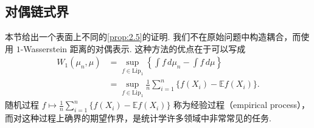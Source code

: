 \subsection{对偶链式界}\label{sec:2.3}
本节给出一个表面上不同的\autoref{prop:2.5}的证明. 我们不在原始问题中构造耦合，而使用 $1$-Wasserstein 距离的对偶表示. 这种方法的优点在于可以写成
\begin{equation}\label{eq:2.6}
\begin{aligned}
W_1(\mu_n,\mu)&=\sup_{f\in\mathrm{Lip}_1}\left\{\int f\,d\mu_n-\int f\,d\mu\right\}\\
&=\sup_{f\in\mathrm{Lip}_1}\frac1n\sum_{i=1}^n\{f(X_i)-\mathbb Ef(X_i)\}.
\end{aligned}
\end{equation}
随机过程 $f\mapsto\frac1n\sum_{i=1}^n\{f(X_i)-\mathbb Ef(X_i)\}$ 称为经验过程（empirical process），而对这种过程上确界的期望作界，是统计学许多领域中非常常见的任务.

